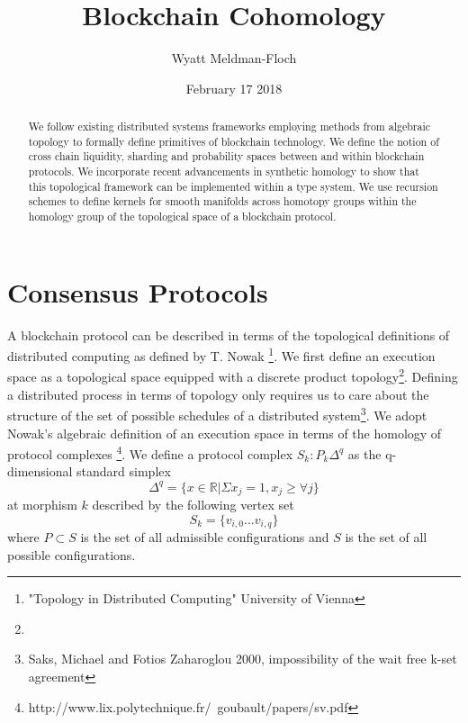 \documentclass{article}
\title{Blockchain Cohomology}
\author{Wyatt Meldman-Floch}
\date{February 17 2018}
\begin{document}
\maketitle

\begin{abstract}
We follow existing distributed systems frameworks employing methods from algebraic topology to formally define primitives of blockchain technology. We define the notion of cross chain liquidity, sharding and probability spaces between and within blockchain protocols. We incorporate recent advancements in synthetic homology to show that this topological framework can be implemented within a type system. We use recursion schemes to define kernels for smooth manifolds across homotopy groups within the homology group of the topological space of a blockchain protocol. 

\end{abstract}

\section{Consensus Protocols}
A blockchain protocol can be described in terms of the topological definitions of distributed computing as defined by T. Nowak \footnote{"Topology in Distributed Computing" University of Vienna}. We first define an execution space as a topological space equipped with a discrete product topology\footnote{}. Defining a distributed process in terms of topology only requires us to care about the structure of the set of possible schedules of a distributed system\footnote{Saks, Michael and Fotios Zaharoglou 2000, impossibility of the wait free k-set agreement}. We adopt Nowak's algebraic definition of an execution space in terms of the homology of protocol complexes \footnote{http://www.lix.polytechnique.fr/~goubault/papers/sv.pdf}. We define a protocol complex $S_k: P_k{\Delta^q}$ as the q-dimensional standard simplex
\begin{equation} \label{eq1}
\Delta^q = \{x \in \mathbb{R} | \Sigma x_j = 1, x_j \geq \forall j \}
\end{equation} \label{eq1}
at morphism $k$ described by the following vertex set
\begin{equation} \label{eq1}
S_k = \{v_{i,0} \dots v_{i,q}\}
\end{equation} \label{eq1}
where $P \subset S$ is the set of all admissible configurations and $S$ is the set of all possible configurations.
 
\end{document}
